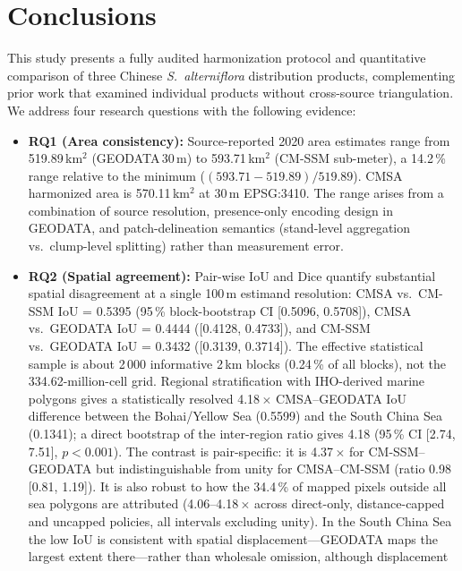 \documentclass[11pt]{article}
\begin{document}
\section{Conclusions}
\label{sec:conclusions}

This study presents a fully audited harmonization protocol and quantitative
comparison of three Chinese \textit{S.~alterniflora} distribution products,
complementing prior work that examined individual products without cross-source
triangulation. We address four research questions with the following evidence:

\begin{itemize}[nosep]
\item \textbf{RQ1 (Area consistency):} Source-reported 2020 area estimates range
  from 519.89\,km$^2$ (GEODATA\,30\,m) to 593.71\,km$^2$ (CM-SSM sub-meter),
  a 14.2\,\% range relative to the minimum ($(593.71-519.89)/519.89$).
  CMSA harmonized area is 570.11\,km$^2$ at 30\,m EPSG:3410. The range arises
  from a combination of source resolution, presence-only encoding design in
  GEODATA, and patch-delineation semantics (stand-level aggregation vs.\
  clump-level splitting) rather than measurement error.
\item \textbf{RQ2 (Spatial agreement):} Pair-wise IoU and Dice quantify
  substantial spatial disagreement at a single 100\,m estimand resolution:
  CMSA vs.\ CM-SSM IoU = 0.5395 (95\,\% block-bootstrap CI [0.5096, 0.5708]),
  CMSA vs.\ GEODATA IoU = 0.4444 ([0.4128, 0.4733]), and CM-SSM vs.\ GEODATA
  IoU = 0.3432 ([0.3139, 0.3714]). The effective statistical sample is about
  2\,000 informative 2\,km blocks (0.24\,\% of all blocks), not the
  334.62-million-cell grid. Regional stratification with IHO-derived marine
  polygons gives a statistically resolved 4.18\,$\times$ CMSA--GEODATA IoU
  difference between the Bohai/Yellow Sea (0.5599) and the South China Sea
  (0.1341); a direct bootstrap of the inter-region ratio gives 4.18
  (95\,\% CI [2.74, 7.51], $p<0.001$). The contrast is pair-specific: it is
  4.37\,$\times$ for CM-SSM--GEODATA but indistinguishable from unity for
  CMSA--CM-SSM (ratio 0.98 [0.81, 1.19]). It is also robust to how the
  34.4\,\% of mapped pixels outside all sea polygons are attributed
  (4.06--4.18\,$\times$ across direct-only, distance-capped and uncapped
  policies, all intervals excluding unity). In the South China Sea the low
  IoU is consistent with spatial displacement---GEODATA maps the largest
  extent there---rather than wholesale omission, although displacement

\end{itemize}
\end{document}
